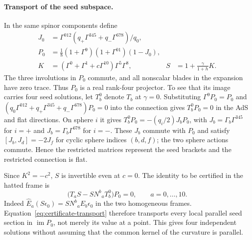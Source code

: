 \paragraph{Transport of the seed subspace.}
In the same spinor components define
\begin{align*}
 J_0&=\Gamma^{012}(q_+\Gamma^{345}+q_-\Gamma^{678})/q_0,\\
 P_0&=\tfrac18(1+\Gamma^9)(1+\Gamma^{01})(1-J_0),\\
 K&=(\Gamma^0+\Gamma^1+c\Gamma^{10})\Gamma^5\Gamma^8,
 & S&=1+\frac{\gamma}{1+h}K .
\end{align*}
The three involutions in $P_0$ commute, and all nonscalar blades in the
expansion have zero trace. Thus $P_0$ is a real rank-four projector. To
see that its image carries four seed solutions, let $T_b^0$ denote $T_b$
at $\gamma=0$. Substituting $\Gamma^9P_0=P_0$ and
$(q_0\Gamma^{012}+q_+\Gamma^{345}+q_-\Gamma^{678})P_0=0$ into the
connection gives $T_b^0P_0=0$ in the AdS and flat directions. On sphere
$i$ it gives $T_b^0P_0=-(q_i/2)J_bP_0$, with $J_b=\Gamma_b\Gamma^{345}$
for $i=+$ and $J_b=\Gamma_b\Gamma^{678}$ for $i=-$. These $J_b$ commute
with $P_0$ and satisfy $[J_b,J_d]=-2J_f$ for cyclic sphere indices
$(b,d,f)$; the two sphere actions commute. Hence the restricted matrices
represent the seed brackets and the restricted connection is flat.

Since $K^2=-c^2$, $S$ is invertible even at $c=0$. The identity to be
certified in the hatted frame is
\begin{equation}
 \bigl(T_a S-S N^b{}_a T_b^0\bigr)P_0=0,
 \qquad a=0,\ldots,10 . \label{eq:certificate-transport}
\end{equation}
Indeed $\widehat E_a(S\epsilon_0)=S N^b{}_a E_b\epsilon_0$ in the two
homogeneous frames. Equation~\eqref{eq:certificate-transport} therefore
transports every local parallel seed section in $\operatorname{im}P_0$,
not merely its value at a point. This gives four independent solutions
without assuming that the common kernel of the curvature is parallel.

